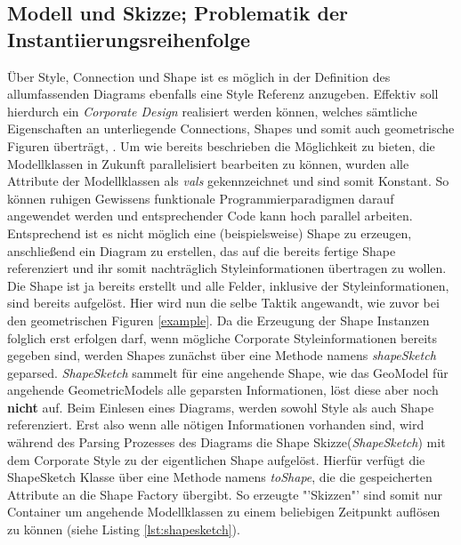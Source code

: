 \subsection{Modell und Skizze; Problematik der Instantiierungsreihenfolge}\label{skizze}
Über Style, Connection und Shape  ist es möglich in der Definition des allumfassenden Diagrams ebenfalls eine Style Referenz anzugeben. Effektiv soll hierdurch ein \textit{Corporate Design} realisiert werden können, welches sämtliche Eigenschaften an unterliegende Connections, Shapes und somit auch geometrische Figuren überträgt, . Um wie bereits beschrieben die Möglichkeit zu bieten, die Modellklassen in Zukunft parallelisiert bearbeiten zu können, wurden alle Attribute der Modellklassen als \textit{vals} gekennzeichnet und sind somit Konstant. So können ruhigen Gewissens funktionale Programmierparadigmen darauf angewendet werden und entsprechender Code kann hoch parallel arbeiten. Entsprechend ist es nicht möglich eine (beispielsweise) Shape zu erzeugen, anschließend ein Diagram zu erstellen, das auf die bereits fertige Shape referenziert und ihr somit nachträglich Styleinformationen übertragen zu wollen. Die Shape ist ja bereits erstellt und alle Felder, inklusive der Styleinformationen, sind bereits aufgelöst. Hier wird nun die selbe Taktik angewandt, wie zuvor bei den geometrischen Figuren \ref{example}. Da die Erzeugung der Shape Instanzen folglich erst erfolgen darf, wenn mögliche Corporate Styleinformationen bereits gegeben sind, werden Shapes zunächst über eine Methode namens \textit{shapeSketch} geparsed. \textit{ShapeSketch} sammelt für eine angehende Shape, wie das GeoModel für angehende GeometricModels alle geparsten Informationen, löst diese aber noch \textbf{nicht} auf. Beim Einlesen eines Diagrams, werden sowohl Style als auch Shape referenziert. Erst also wenn alle nötigen Informationen vorhanden sind, wird während des Parsing Prozesses des Diagrams die Shape Skizze(\textit{ShapeSketch}) mit dem Corporate Style zu der eigentlichen Shape aufgelöst. Hierfür verfügt die ShapeSketch Klasse über eine Methode namens \textit{toShape}, die die gespeicherten Attribute an die Shape Factory übergibt. So erzeugte "'Skizzen"' sind somit nur Container um angehende Modellklassen zu einem beliebigen Zeitpunkt auflösen zu können (siehe Listing \ref{lst:shapesketch}).
